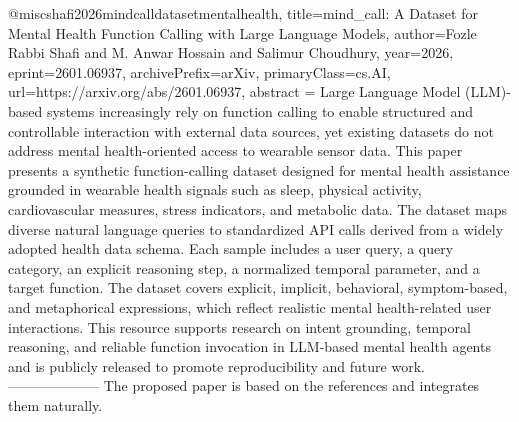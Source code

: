 {}@misc{shafi2026mindcalldatasetmentalhealth,
      title={mind_call: A Dataset for Mental Health Function Calling with Large Language Models}, 
      author={Fozle Rabbi Shafi and M. Anwar Hossain and Salimur Choudhury},
      year={2026},
      eprint={2601.06937},
      archivePrefix={arXiv},
      primaryClass={cs.AI},
      url={https://arxiv.org/abs/2601.06937},
      abstract = {Large Language Model (LLM)-based systems increasingly rely on function calling to enable structured and controllable interaction with external data sources, yet existing datasets do not address mental health-oriented access to wearable sensor data. This paper presents a synthetic function-calling dataset designed for mental health assistance grounded in wearable health signals such as sleep, physical activity, cardiovascular measures, stress indicators, and metabolic data. The dataset maps diverse natural language queries to standardized API calls derived from a widely adopted health data schema. Each sample includes a user query, a query category, an explicit reasoning step, a normalized temporal parameter, and a target function. The dataset covers explicit, implicit, behavioral, symptom-based, and metaphorical expressions, which reflect realistic mental health-related user interactions. This resource supports research on intent grounding, temporal reasoning, and reliable function invocation in LLM-based mental health agents and is publicly released to promote reproducibility and future work.}
}
        --------------------
         The proposed paper is based on the references and integrates them naturally.
        
